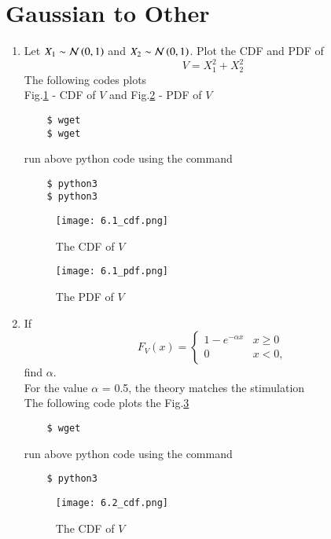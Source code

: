 \documentclass[journal,12pt,twocolumn]{IEEEtran}
\renewcommand\thesection{\arabic{section}}
\begin{document}
\section{Gaussian to Other}
\begin{enumerate}[label=\thesection.\arabic*
,ref=\thesection.\theenumi]
\item
Let $X_1 \sim  \mathcal{N}\left(0,1\right)$ and $X_2 \sim  \mathcal{N}\left(0,1\right)$. Plot the CDF and PDF of
%
\begin{equation}
V = X_1^2 + X_2^2
\end{equation}
\solution The following codes plots\\
 Fig.\ref{fig:6.1_cdf} - CDF of $V$ and Fig.\ref{fig:6.1_pdf} - PDF of $V$
\begin{lstlisting}
    $ wget 
    $ wget 
\end{lstlisting}
run above python code using the command
\begin{lstlisting}
    $ python3 
    $ python3 
\end{lstlisting}
\begin{figure}[h]
    \centering
    \texttt{[image: 6.1\_cdf.png]}
    \caption{The CDF of $V$}
    \label{fig:6.1_cdf}
\end{figure}
\begin{figure}[h]
    \centering
    \texttt{[image: 6.1\_pdf.png]}
    \caption{The PDF of $V$}
    \label{fig:6.1_pdf}
\end{figure}
%
%
%
\item
If
%
\begin{equation}
F_{V}(x) = 
\begin{cases}
1 - e^{-\alpha x} & x \geq 0 \\
0 & x < 0,
\end{cases}
\end{equation}
%
find $\alpha$.\\
\solution For the value $\alpha$ = 0.5, the theory matches the stimulation\\
The following code plots the Fig.\ref{fig:6.2_cdf}
\begin{lstlisting}
    $ wget
\end{lstlisting}
run above python code using the command
\begin{lstlisting}
    $ python3
\end{lstlisting}
\begin{figure}[h]
    \centering
    \texttt{[image: 6.2\_cdf.png]}
    \caption{The CDF of $V$}
    \label{fig:6.2_cdf}
\end{figure}


\end{enumerate}
\end{document}

